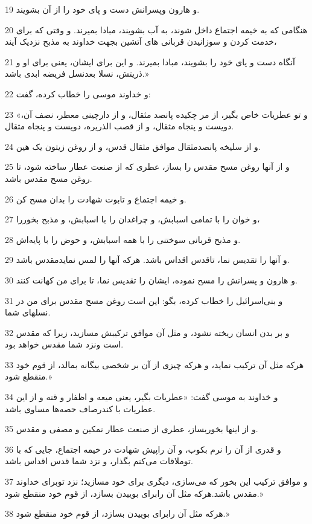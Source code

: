 \par 19 و هارون وپسرانش دست و پای خود را از آن بشویند.
\par 20 هنگامی که به خیمه اجتماع داخل شوند، به آب بشویند، مبادا بمیرند. و وقتی که برای خدمت کردن و سوزانیدن قربانی های آتشین بجهت خداوند به مذبح نزدیک آیند،
\par 21 آنگاه دست و پای خود را بشویند، مبادا بمیرند. و این برای ایشان، یعنی برای او و ذریتش، نسلا بعدنسل فریضه ابدی باشد.» 
\par 22 و خداوند موسی را خطاب کرده، گفت:
\par 23 «و تو عطریات خاص بگیر، از مر چکیده پانصد مثقال، و از دارچینی معطر، نصف آن، دویست و پنجاه مثقال، و از قصب الذریره، دویست و پنجاه مثقال.
\par 24 و از سلیخه پانصدمثقال موافق مثقال قدس، و از روغن زیتون یک هین.
\par 25 و از آنها روغن مسح مقدس را بساز، عطری که از صنعت عطار ساخته شود، تا روغن مسح مقدس باشد.
\par 26 و خیمه اجتماع و تابوت شهادت را بدان مسح کن.
\par 27 و خوان را با تمامی اسبابش، و چراغدان را با اسبابش، و مذبح بخوررا،
\par 28 و مذبح قربانی سوختنی را با همه اسبابش، و حوض را با پایه‌اش.
\par 29 و آنها را تقدیس نما، تاقدس اقداس باشد. هر‌که آنها را لمس نمایدمقدس باشد.
\par 30 و هارون و پسرانش را مسح نموده، ایشان را تقدیس نما، تا برای من کهانت کنند.
\par 31 و بنی‌اسرائیل را خطاب کرده، بگو: این است روغن مسح مقدس برای من در نسلهای شما.
\par 32 و بر بدن انسان ریخته نشود، و مثل آن موافق ترکیبش مسازید، زیرا که مقدس است ونزد شما مقدس خواهد بود.
\par 33 هر‌که مثل آن ترکیب نماید، و هر‌که چیزی از آن بر شخصی بیگانه بمالد، از قوم خود منقطع شود.»
\par 34 و خداوند به موسی گفت: «عطریات بگیر، یعنی میعه و اظفار و قنه و از این عطریات با کندرصاف حصه‌ها مساوی باشد.
\par 35 و از اینها بخوربساز، عطری از صنعت عطار نمکین و مصفی و مقدس.
\par 36 و قدری از آن را نرم بکوب، و آن راپیش شهادت در خیمه اجتماع، جایی که با توملاقات می‌کنم بگذار، و نزد شما قدس اقداس باشد.
\par 37 و موافق ترکیب این بخور که می‌سازی، دیگری برای خود مسازید؛ نزد توبرای خداوند مقدس باشد.هر‌که مثل آن رابرای بوییدن بسازد، از قوم خود منقطع شود.»
\par 38 هر‌که مثل آن رابرای بوییدن بسازد، از قوم خود منقطع شود.»
 
